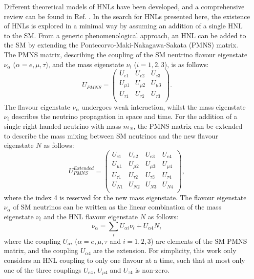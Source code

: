 Different theoretical models of HNLs have been developed, and a comprehensive review can be found in Ref. \cite{HNLPresentFuture}. 
In the search for HNLs presented here, the existence of HNLs is explored in a minimal way by assuming an addition of a single HNL to the SM.  
From a generic phenomenological approach, an HNL can be added to the SM by extending the Pontecorvo-Maki-Nakagawa-Sakata (PMNS) matrix.
The PMNS matrix, describing the coupling of the SM neutrino flavour eigenstate $\nu_{\alpha}$ ($\alpha=e,\mu,\tau$), and the mass eigenstate $\nu_{i}$ ($i=1,2,3$), is as follows:
\begin{equation}
	U_{PMNS} =
	\begin{pmatrix}
		U_{e1} & U_{e2} & U_{e3}\\
		U_{\mu1} & U_{\mu2} & U_{\mu3}\\
		U_{\tau1} & U_{\tau2} & U_{\tau3}\\
	\end{pmatrix}.
\end{equation}
The flavour eigenstate $\nu_{\alpha}$ undergoes weak interaction, whilst the mass eigenstate $\nu_{i}$ describes the neutrino propagation in space and time.
For the addition of a single right-handed neutrino with mass $m_{N}$, the PMNS matrix can be extended to describe the mass mixing between SM neutrinos and the new flavour eigenstate $N$ as follows:
\begin{equation}
	U_{PMNS}^{Extended} =
	\begin{pmatrix}
		U_{e1} & U_{e2} & U_{e3} & U_{e4}\\
		U_{\mu1} & U_{\mu2} & U_{\mu3} & U_{\mu4}\\
		U_{\tau1} & U_{\tau2} & U_{\tau3} & U_{\tau4}\\
		U_{N1} & U_{N2} & U_{N3} & U_{N4}\\
	\end{pmatrix},
\end{equation}
where the index 4 is reserved for the new mass eigenstate.
The flavour eigenstate  $\nu_{\alpha}$ of SM neutrinos can be written as the linear combination of the mass eigenstate $\nu_{i}$ and the HNL flavour eigenstate $N$ as follows:
\begin{equation}
	\nu_{\alpha}=\sum_i U_{\alpha i}\nu_{i} + U_{\alpha 4}N,
\end{equation}
where the coupling $U_{\alpha i }$ ($\alpha=e,\mu,\tau$ and $i=1,2,3$) are elements of the SM PMNS matrix, and the coupling $U_{\alpha 4}$ are the extension.
For simplicity, this work only considers an HNL coupling to only one flavour at a time, such that at most only one of the three couplings $U_{e4}$, $U_{\mu4}$ and $U_{\tau4}$ is non-zero.

